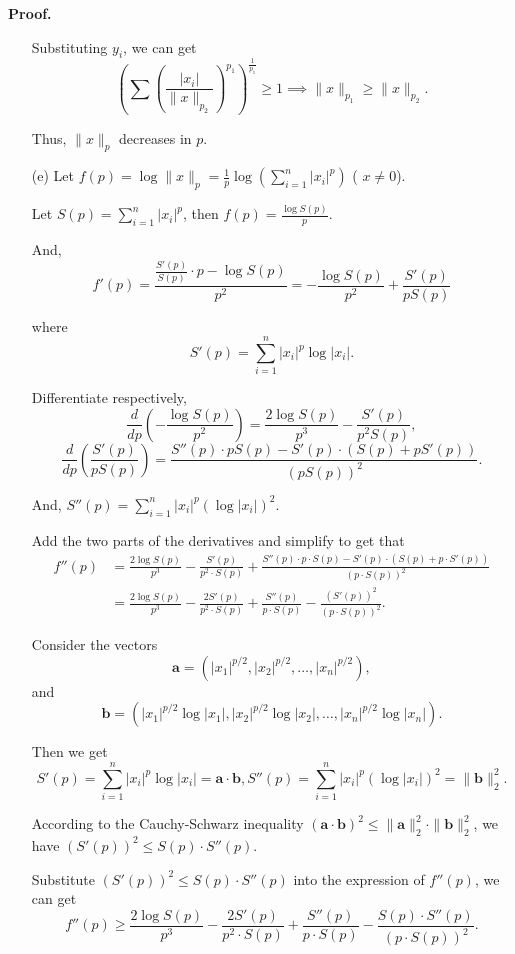 \documentclass[a4paper, 11pt]{article}
\newenvironment{solution}
    {\textbf{Proof.}}
    {}
\begin{document}
\begin{solution}
\begin{enumerate}
	 Substituting \( y_i \), we can get
$$
	 \left( \sum \left( \frac{|x_i|}{\|x\|_{p_2}} \right)^{p_1} \right)^{\frac{1}{p_1}} \geq 1 \implies \|x\|_{p_1} \geq \|x\|_{p_2}.
$$
	 
	 Thus, \( \|x\|_p \) decreases in \( p \).
	 	 
	\item[(e)] 
Let \( f(p) = \log \|x\|_p = \frac{1}{p} \log \left( \sum_{i=1}^n |x_i|^p \right) \) ( \( x \neq 0 \)).

Let \( S(p) = \sum_{i=1}^n |x_i|^p \), then \( f(p) = \frac{\log S(p)}{p} \).

And, $$ f'(p) = \frac{\frac{S'(p)}{S(p)} \cdot p - \log S(p)}{p^2}=-\frac{\log S(p)}{p^2}+\frac{S'(p)}{pS(p)}$$

where $$ S'(p) = \sum_{i=1}^n |x_i|^p \log |x_i| .$$
	 	 
Differentiate respectively,
$$
\frac{d}{dp}\left(-\frac{\log S(p)}{p^2}\right)=\frac{2\log S(p)}{p^3}-\frac{S'(p)}{p^2S(p)},
$$
$$
\frac{d}{dp}\left(\frac{S'(p)}{pS(p)}\right)=\frac{S''(p)\cdot pS(p)-S'(p)\cdot(S(p)+pS'(p))}{(pS(p))^2}.
$$

And, \( S''(p)=\sum_{i = 1}^n|x_i|^p(\log|x_i|)^2 \).

Add the two parts of the derivatives and simplify to get that 
$$
\begin{align*}
	f''(p)&=\frac{2\log S(p)}{p^3}-\frac{S'(p)}{p^2\cdot S(p)}+\frac{S''(p)\cdot p\cdot S(p)-S'(p)\cdot(S(p)+p\cdot S'(p))}{(p\cdot S(p))^2}\\
	&=\frac{2\log S(p)}{p^3}-\frac{2S'(p)}{p^2\cdot S(p)}+\frac{S''(p)}{p\cdot S(p)}-\frac{(S'(p))^2}{(p\cdot S(p))^2}.
\end{align*}
$$

Consider the vectors 
$$
 \mathbf{a} = \left(|x_1|^{p/2}, |x_2|^{p/2}, \dots, |x_n|^{p/2}\right) ,
 $$
 and 
 $$
  \mathbf{b} = \left(|x_1|^{p/2}\log|x_1|, |x_2|^{p/2}\log|x_2|, \dots, |x_n|^{p/2}\log|x_n|\right) .
  $$ 
  
  Then we get 
$$
 S'(p)=\sum_{i = 1}^n|x_i|^p\log|x_i|=\mathbf{a}\cdot\mathbf{b} ,  S''(p)=\sum_{i = 1}^n|x_i|^p(\log|x_i|)^2=\|\mathbf{b}\|_2^2.
$$

According to the Cauchy-Schwarz inequality \( (\mathbf{a}\cdot\mathbf{b})^2\leq\|\mathbf{a}\|_2^2\cdot\|\mathbf{b}\|_2^2 \), we have \( (S'(p))^2\leq S(p)\cdot S''(p) \).

Substitute \( (S'(p))^2\leq S(p)\cdot S''(p) \) into the expression of \( f''(p) \), we can get
$$
f''(p)\geq\frac{2\log S(p)}{p^3}-\frac{2S'(p)}{p^2\cdot S(p)}+\frac{S''(p)}{p\cdot S(p)}-\frac{S(p)\cdot S''(p)}{(p\cdot S(p))^2}.
$$


\end{enumerate}
\end{solution}
\end{document}
